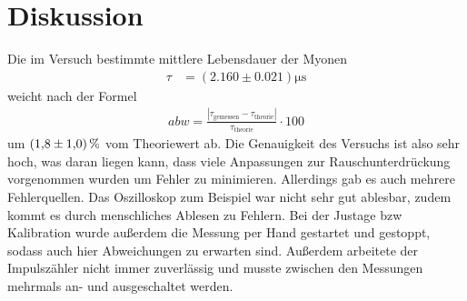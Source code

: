 \section{Diskussion}
\label{sec:Diskussion}

Die im Versuch bestimmte mittlere Lebensdauer der Myonen
\begin{align*}
    \tau &= (2.160 \pm 0.021)\si{\micro\second}
\end{align*}
weicht nach der Formel
\begin{align*}
    abw=\frac{|\tau_\mathrm{gemessen}-\tau_\mathrm{theorie}|}{\tau_\mathrm{theorie}}\cdot 100 \label{eqn:abweich}
\end{align*}
um $\qty{1.8 \pm 1.0}{\percent}$ vom Theoriewert\cite{PDG} ab.
Die Genauigkeit des Versuchs ist also sehr hoch, was daran liegen kann, dass viele Anpassungen zur Rauschunterdrückung
vorgenommen wurden um Fehler zu minimieren.
Allerdings gab es auch mehrere Fehlerquellen.
Das Oszilloskop zum Beispiel war nicht sehr gut ablesbar, zudem kommt es durch menschliches Ablesen zu Fehlern.
Bei der Justage bzw Kalibration wurde außerdem die Messung per Hand gestartet und gestoppt, sodass auch hier Abweichungen zu erwarten sind.
Außerdem arbeitete der Impulszähler nicht immer zuverlässig und musste zwischen den Messungen mehrmals an- und ausgeschaltet werden.

